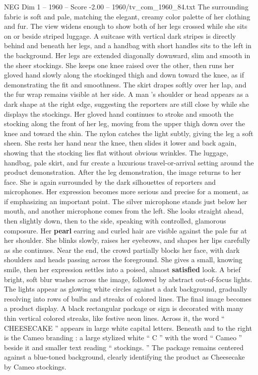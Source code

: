 \begin{textsample}{NEG Dim 1 – 1960 – Score -2.00 – 1960/tv\_com\_1960\_84.txt}
The surrounding fabric is soft and pale, matching the elegant, creamy color palette of her clothing and fur.
The view widens enough to show both of her legs crossed while she sits on or beside striped luggage.
A suitcase with vertical dark stripes is directly behind and beneath her legs, and a handbag with short handles sits to the left in the background.
Her legs are extended diagonally downward, slim and smooth in the sheer stockings.
She keeps one knee raised over the other, then runs her gloved hand slowly along the stockinged thigh and down toward the knee, as if demonstrating the fit and smoothness.
The skirt drapes softly over her lap, and the fur wrap remains visible at her side.
A man ’s shoulder or head appears as a dark shape at the right edge, suggesting the reporters are still close by while she displays the stockings.
Her gloved hand continues to stroke and smooth the stocking along the front of her leg, moving from the upper thigh down over the knee and toward the shin.
The nylon catches the light subtly, giving the leg a soft sheen.
She rests her hand near the knee, then slides it lower and back again, showing that the stocking lies flat without obvious wrinkles.
The luggage, handbag, pale skirt, and fur create a luxurious travel-or-arrival setting around the product demonstration.
After the leg demonstration, the image returns to her face.
She is again surrounded by the dark silhouettes of reporters and microphones.
Her expression becomes more serious and precise for a moment, as if emphasizing an important point.
The silver microphone stands just below her mouth, and another microphone comes from the left.
She looks straight ahead, then slightly down, then to the side, speaking with controlled, glamorous composure.
Her \textbf{pearl} earring and curled hair are visible against the pale fur at her shoulder.
She blinks slowly, raises her eyebrows, and shapes her lips carefully as she continues.
Near the end, the crowd partially blocks her face, with dark shoulders and heads passing across the foreground.
She gives a small, knowing smile, then her expression settles into a poised, almost \textbf{satisfied} look.
A brief bright, soft blur washes across the image, followed by abstract out-of-focus lights.
The lights appear as glowing white circles against a dark background, gradually resolving into rows of bulbs and streaks of colored lines.
The final image becomes a product display.
A black rectangular package or sign is decorated with many thin vertical colored streaks, like festive neon lines.
Across it, the word “ CHEESECAKE ” appears in large white capital letters.
Beneath and to the right is the Cameo branding : a large stylized white “ C ” with the word “ Cameo ” beside it and smaller text reading “ stockings. ” The package remains centered against a blue-toned background, clearly identifying the product as Cheesecake by Cameo stockings.

\end{textsample}
